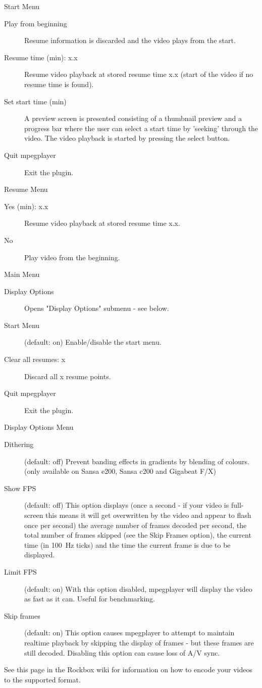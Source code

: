 Start Menu

\begin{description}
\item[Play from beginning] Resume information is discarded and the video plays
    from the start.
\item[Resume time (min): x.x] Resume video playback at stored resume time x.x
    (start of the video if no resume time is found).
\item[Set start time (min)] A preview screen is presented consisting of a
    thumbnail preview and a progress bar where the user can select a start time
    by 'seeking' through the video. The video playback is started by pressing
    the select button.
\item[Quit mpegplayer] Exit the plugin.
\end{description}

Resume Menu

\begin{description}
\item[Yes (min): x.x] Resume video playback at stored resume time x.x.
\item[No] Play video from the beginning.
\end{description}

Main Menu

\begin{description}
\item[Display Options] Opens "Display Options" submenu - see below.
\item[Start Menu] (default: on) Enable/disable the start menu.
\item[Clear all resumes: x] Discard all x resume points.
\item[Quit mpegplayer] Exit the plugin.
\end{description}

Display Options Menu

\begin{description}
\item[Dithering] (default: off) Prevent banding effects in gradients by blending
    of colours. (only available on Sansa e200, Sansa c200 and Gigabeat F/X)
\item[Show FPS] (default: off) This option displays (once a second - if your
    video is full-screen this means it will get overwritten by the video and
    appear to flash once per second) the average number of frames decoded per
    second, the total number of frames skipped (see the Skip Frames option),
    the current time (in 100~Hz ticks) and the time the current frame is due to
    be displayed.
\item[Limit FPS] (default: on) With this option disabled, mpegplayer will
    display the video as fast as it can. Useful for benchmarking.
\item[Skip frames] (default: on) This option causes mpegplayer to attempt to
    maintain realtime playback by skipping the display of frames - but these
    frames are still decoded. Disabling this option can cause loss of A/V sync. 
\end{description}

See this page in the Rockbox wiki for information on how to encode your videos
to the supported format. 
